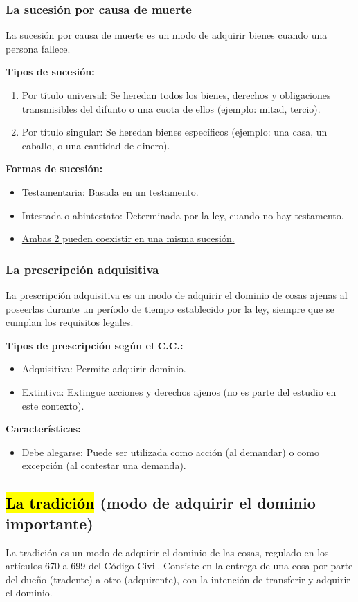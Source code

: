\documentclass{templateNote}
\begin{document}
\subsubsection{La sucesión por causa de muerte}
La sucesión por causa de muerte es un modo de adquirir bienes cuando una persona fallece.

\noindent\textbf{Tipos de sucesión:}
\begin{enumerate}
    \item Por título universal: Se heredan todos los bienes, derechos y obligaciones transmisibles del difunto o una cuota de ellos (ejemplo: mitad, tercio).
    \item Por título singular: Se heredan bienes específicos (ejemplo: una casa, un caballo, o una cantidad de dinero).
\end{enumerate}

\noindent\textbf{Formas de sucesión:}
\begin{itemize}
    \item Testamentaria: Basada en un testamento.
    \item Intestada o abintestato: Determinada por la ley, cuando no hay testamento.
    \item \underline{Ambas 2 pueden coexistir en una misma sucesión.}
\end{itemize}

\subsubsection{La prescripción adquisitiva}
La prescripción adquisitiva es un modo de adquirir el dominio de cosas ajenas al poseerlas durante un período de tiempo establecido por la ley, siempre que se cumplan los requisitos legales.

\noindent\textbf{Tipos de prescripción según el C.C.:}
\begin{itemize}
    \item Adquisitiva: Permite adquirir dominio.
    \item Extintiva: Extingue acciones y derechos ajenos (no es parte del estudio en este contexto).
\end{itemize}
\noindent\textbf{Características:}
\begin{itemize}
    \item Debe alegarse: Puede ser utilizada como acción (al demandar) o como excepción (al contestar una demanda).
\end{itemize}

\subsection{\hl{La tradición} (modo de adquirir el dominio importante)}
La tradición es un modo de adquirir el dominio de las cosas, regulado en los artículos 670 a 699 del Código Civil. Consiste en la entrega de una cosa por parte del dueño (tradente) a otro (adquirente), con la intención de transferir y adquirir el dominio.
\end{document}
